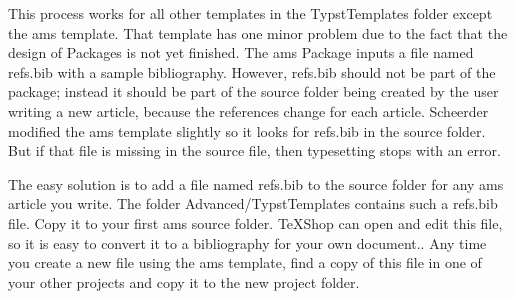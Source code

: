 \documentclass[11pt, oneside]{article}   	%
\begin{document}
This process works for all other templates in the TypstTemplates folder except the ams template. That template
has one minor problem due to the fact that the design of Packages is not yet finished. The ams Package 
inputs a file named refs.bib with a sample bibliography. However, refs.bib should not be part of the package; instead it should be part of the source folder being created by the user writing a new article, because the references change for each article. Scheerder modified the ams template slightly so it looks for refs.bib in the source folder. But if that file is missing in the source file, then typesetting stops with an error. 

The easy solution is to add a file named refs.bib to the source folder for any ams article you write. The folder 
Advanced/TypstTemplates contains such a refs.bib file. Copy it to your first ams source folder. TeXShop can open and edit this file, so it is easy to convert it to a bibliography for your own document.. Any time you create a new file using the ams template, find a copy of this file in one of your other projects and copy it to the new project folder.

%
%
\end{document}
